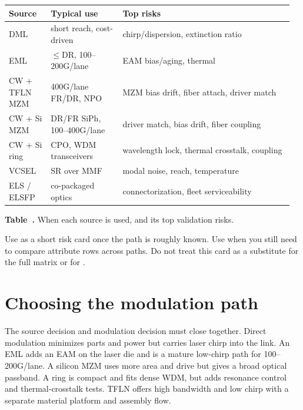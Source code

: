 \begin{table}[ht]
\label{tab:laser-choice}%
\centering
\setlength{\tabcolsep}{5pt}%
\renewcommand{\arraystretch}{1.25}%
\begin{tabular}{@{}p{0.14\linewidth}p{0.24\linewidth}p{0.58\linewidth}@{}}
\toprule
Source & Typical use & Top risks \\
\midrule
DML & short reach, cost-driven & chirp/dispersion, extinction ratio \\
\addlinespace[1.5em]
EML & $\le$DR, 100--200G/lane & EAM bias/aging, thermal \\
\addlinespace[1.5em]
CW + TFLN MZM & 400G/lane FR/DR, NPO & MZM bias drift, fiber attach, driver match \\
\addlinespace[1.5em]
CW + Si MZM & DR/FR SiPh, 100--400G/lane & driver match, bias drift, fiber coupling \\
\addlinespace[1.5em]
CW + Si ring & CPO, WDM transceivers & wavelength lock, thermal crosstalk, coupling \\
\addlinespace[1.5em]
VCSEL & SR over MMF & modal noise, reach, temperature \\
\addlinespace[1.5em]
ELS / ELSFP & co-packaged optics & connectorization, fleet serviceability \\
\bottomrule
\end{tabular}
\par\medskip
{\raggedright\footnotesize\textbf{Table~\thetable.} When each source is used, and its top validation risks.\par}
\end{table}

Use  as a short risk card once the path is roughly
known. Use  when you still need to compare
attribute rows across paths. Do not treat this card as a substitute for the
full matrix or for .

\section{Choosing the modulation path}
\label{sec:siph-platforms}

The source decision and modulation decision must close together. Direct
modulation minimizes parts and power but carries laser chirp into the link. An
EML adds an EAM on the laser die and is a mature low-chirp path for
100--200G/lane. A silicon MZM uses more area and drive but gives a broad optical
passband. A ring is compact and fits dense WDM, but adds resonance control and
thermal-crosstalk tests. TFLN offers high bandwidth and low chirp with a separate
material platform and assembly flow.

